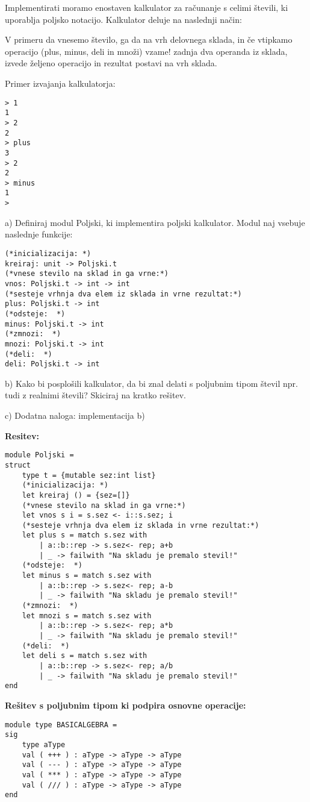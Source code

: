 \begin{ex}
Implementirati moramo enostaven kalkulator za ra\v cunanje s celimi
\v stevili, ki uporablja poljsko notacijo. Kalkulator deluje na naslednji
na\v cin:

V primeru da vnesemo \v stevilo, ga da na vrh delovnega sklada, in \v ce
vtipkamo operacijo (plus, minus, deli in mno\v zi) vzame! zadnja dva
operanda iz sklada, izvede \v zeljeno operacijo in rezultat postavi na
vrh sklada.

Primer izvajanja kalkulatorja: 
\begin{lstlisting}
> 1 
1 
> 2 
2 
> plus 
3 
> 2 
2 
> minus 
1 
> 
\end{lstlisting}

a) Definiraj modul Poljski, ki implementira poljski kalkulator. Modul
naj vsebuje naslednje funkcije:

\begin{lstlisting}
(*inicializacija: *)
kreiraj: unit -> Poljski.t      
(*vnese stevilo na sklad in ga vrne:*)
vnos: Poljski.t -> int -> int   
(*sesteje vrhnja dva elem iz sklada in vrne rezultat:*)
plus: Poljski.t -> int    
(*odsteje:  *)
minus: Poljski.t -> int         
(*zmnozi:  *)
mnozi: Poljski.t -> int         
(*deli:  *)
deli: Poljski.t -> int          
\end{lstlisting}

b) Kako bi posplo\v sili kalkulator, da bi znal delati s poljubnim tipom \v stevil npr. tudi z realnimi \v stevili? Skiciraj na kratko re\v sitev. 

c) Dodatna naloga: implementacija b)  

\begin{sol}

\textbf{Resitev:}
\begin{lstlisting}
module Poljski = 
struct
    type t = {mutable sez:int list}
    (*inicializacija: *)
    let kreiraj () = {sez=[]}
    (*vnese stevilo na sklad in ga vrne:*)
    let vnos s i = s.sez <- i::s.sez; i
    (*sesteje vrhnja dva elem iz sklada in vrne rezultat:*)
    let plus s = match s.sez with
        | a::b::rep -> s.sez<- rep; a+b
        | _ -> failwith "Na skladu je premalo stevil!"
    (*odsteje:  *)
    let minus s = match s.sez with
        | a::b::rep -> s.sez<- rep; a-b
        | _ -> failwith "Na skladu je premalo stevil!"
    (*zmnozi:  *)
    let mnozi s = match s.sez with
        | a::b::rep -> s.sez<- rep; a*b
        | _ -> failwith "Na skladu je premalo stevil!"
    (*deli:  *)
    let deli s = match s.sez with
        | a::b::rep -> s.sez<- rep; a/b
        | _ -> failwith "Na skladu je premalo stevil!"
end
\end{lstlisting}
\textbf{Re\v sitev s poljubnim tipom ki podpira osnovne operacije:}
\begin{lstlisting}
module type BASICALGEBRA = 
sig
    type aType
    val ( +++ ) : aType -> aType -> aType
    val ( --- ) : aType -> aType -> aType
    val ( *** ) : aType -> aType -> aType
    val ( /// ) : aType -> aType -> aType
end


\end{lstlisting}
\end{sol}
\end{ex}
